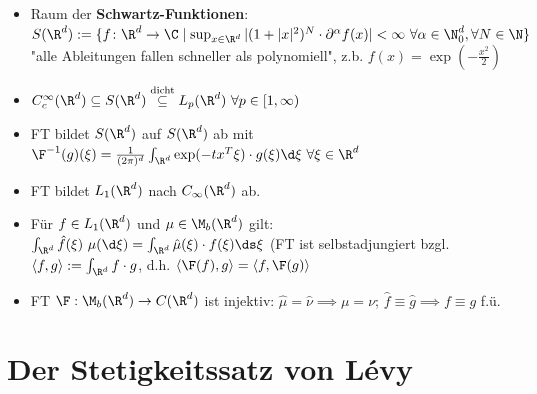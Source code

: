 	\begin{itemize}
		\item Raum der \textbf{Schwartz-Funktionen}: $S(\R^d):=\lbrace f\colon\R^d\to\C\mid\sup_{x\in\R^d}|(1+|x|^2)^N\cdot\partial^\alpha f(x)|<\infty~\forall\alpha\in\N^d_0,\forall N\in\N\rbrace$ "alle Ableitungen fallen schneller als polynomiell", z.b. $f(x)=\exp(-\frac{x^2}{2})$
		\item $C_c^\infty(\R^d)\subseteq S(\R^d)\overset{\text{dicht}}{\subseteq} L_p(\R^d)~\forall p\in[1,\infty)$
		\item FT bildet $S(\R^d)$  auf $S(\R^d)$ ab mit $\F^{-1}(g)(\xi)=\frac{1}{(2\pi)^d}\int_{\R^d}\exp(-t x^T\xi)\cdot g(\xi)\d\xi~\forall\xi\in\R^d$
		\item {} FT bildet $L_1(\R^d)$ nach $C_\infty(\R^d)$ ab.
		\item {} Für $f\in L_1(\R^d)$ und $\mu\in\M_b(\R^d)$ gilt: $\int_{\R^d}\hat{f}(\xi)~\mu(\d\xi)=\int_{\R^d}\hat{\mu}(\xi)\cdot f(\xi)\ds\xi$ (FT ist selbstadjungiert bzgl. $\langle f,g\rangle:=\int_{\R^d} f\cdot g$, d.h. $\langle\F(f),g\rangle=\langle f,\F(g)\rangle$
		\item {} FT $\F:\M_b(\R^d)\to C(\R^d)$ ist injektiv: $\hat{\mu}=\hat{\nu}\implies \mu=\nu$; $\hat{f}\equiv\hat{g}\implies f\equiv g$ f.ü.
	\end{itemize}
	
	\section{Der Stetigkeitssatz von Lévy}
	
